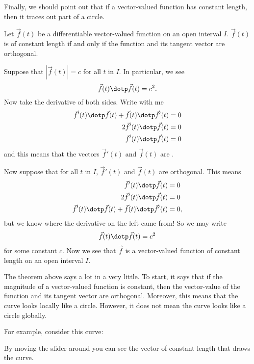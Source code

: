\documentclass{ximera}
\begin{document}
Finally, we should point out that if a vector-valued function has
constant length, then it traces out part of a circle.
\begin{theorem}
  Let $\vec f(t)$ be a differentiable vector-valued function on an
  open interval $I$. $\vec{f}(t)$ is of constant length if and only if
  the function and its tangent vector are orthogonal.
  \begin{explanation}
    Suppose that $|\vec f(t)| = c$ for all $t$ in $I$. In particular,
    we see
    \[
    \vec{f}(t) \dotp \vec{f}(t) = c^2.
    \]
    Now take the derivative of both sides. Write with me
    \begin{align*}
      \vec{f}'(t) \dotp \vec{f}(t) + \vec{f}(t)\dotp \vec{f}'(t) &= 0\\
      2\vec{f}'(t) \dotp \vec{f}(t) &= 0\\
      \vec{f}'(t) \dotp \vec{f}(t) &= 0
    \end{align*}
    and this means that the vectors $\vec{f}'(t)$ and $\vec{f}(t)$ are
    .

    Now suppose that for all $t$ in $I$, $\vec{f}'(t)$ and
    $\vec{f}(t)$ are orthogonal. This means
    \begin{align*}
      \vec{f}'(t) \dotp \vec{f}(t) &= 0\\
      2\vec{f}'(t) \dotp \vec{f}(t) &= 0\\
      \vec{f}'(t) \dotp \vec{f}(t) + \vec{f}(t)\dotp \vec{f}'(t) &= 0,
    \end{align*}
    but we know where the derivative on the left came from! So we may
    write
    \[
    \vec{f}(t) \dotp \vec{f}(t) = c^2
    \]
    for some constant $c$. Now we see that $\vec{f}$ is a
    vector-valued function of constant length on an open interval
    $I$.
  \end{explanation}
\end{theorem}
The theorem above says a lot in a very little. To start, it says that
if the magnitude of a vector-valued function is constant, then the
vector-value of the function and its tangent vector are
orthogonal. Moreover, this means that the curve looks locally like a
circle. However, it does not mean the curve looks like a circle globally.
\begin{onlineOnly}
  For example, consider this curve:

  \begin{center}
  \end{center}

  By moving the slider around you can see the vector of constant
  length that draws the curve.
\end{onlineOnly}
\end{document}
